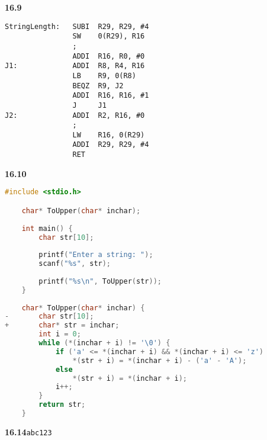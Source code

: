 ﻿\documentclass[UTF8]{ctexart}
\begin{document}
\noindent\textbf{16.9}
\linespread{1}
\begin{lstlisting}[numbers = none]
StringLength:   SUBI  R29, R29, #4
                SW    0(R29), R16
                ;
                ADDI  R16, R0, #0
J1:             ADDI  R8, R4, R16
                LB    R9, 0(R8)
                BEQZ  R9, J2
                ADDI  R16, R16, #1
                J     J1
J2:             ADDI  R2, R16, #0
                ;
                LW    R16, 0(R29)
                ADDI  R29, R29, #4
                RET
\end{lstlisting}

\noindent\textbf{16.10}
\begin{lstlisting}[language=C]
    #include <stdio.h>

    char* ToUpper(char* inchar);
  
    int main() {
        char str[10];
  
        printf("Enter a string: ");
        scanf("%s", str);
  
        printf("%s\n", ToUpper(str));
    }
  
    char* ToUpper(char* inchar) {
-       char str[10];
+       char* str = inchar;
        int i = 0;
        while (*(inchar + i) != '\0') {
            if ('a' <= *(inchar + i) && *(inchar + i) <= 'z')
                *(str + i) = *(inchar + i) - ('a' - 'A');
            else
                *(str + i) = *(inchar + i);
            i++;
        }
        return str;
    }
\end{lstlisting}

\linespread{1.5}

\noindent\textbf{16.14}\quad\texttt{abc123}
\end{document}
